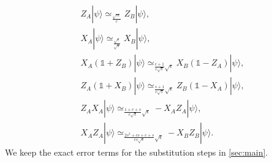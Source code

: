 \documentclass[11pt,letterpaper]{article}
\newcommand{\ket}[1]{|#1\rangle}
\newcommand{\1}{\mathbb{1}}
\newcommand{\se}{\sqrt{\epsilon}}
\newcommand{\appd}[1]{\simeq_{#1}}
\theoremstyle{definition}
\begin{document}
\begin{align}
\label{eq:za-zb}& Z_A\ket{\psi} \appd{\frac{\sqrt{s\epsilon}}{c}} Z_B\ket{\psi},\\
	\label{eq:xa-xb}&X_A\ket{\psi} \appd{\frac{\sqrt{\epsilon}}{\sqrt{s}}} X_B \ket{\psi}, \\
	\label{eq:xazb}&X_A(\1+Z_B)\ket{\psi} \appd{\frac{c+1}{c\sqrt{s}} \se} X_B(\1-Z_A) \ket{\psi},\\
	\label{eq:zaxb}&Z_A(\1+X_B)\ket{\psi} \appd{ \frac{s+1}{c\sqrt{s}} \se} Z_B(\1-X_A) \ket{\psi},\\
	\label{eq:zaxa}&Z_AX_A\ket{\psi} \appd{\frac{1+c+s}{c\sqrt{s}} \se} -X_AZ_A \ket{\psi},\\
	\label{eq:zaxaxbzb}&X_AZ_A \ket{\psi} \appd{\frac{2s^2+cs+c+s}{cs\sqrt{s}} \sqrt{\epsilon}} -X_BZ_B \ket{\psi}.
\end{align}
We keep the exact error terms for the substitution steps in \cref{sec:main}.

\end{document}
